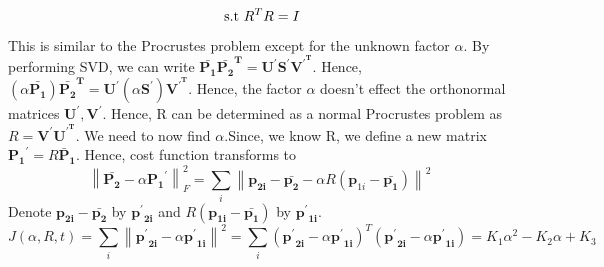 \documentclass[11pt]{article}
\newcommand{\norm}[1]{\left\lVert#1\right\rVert}
\begin{document}
\begin{enumerate}
\begin{itemize}
\begin{equation}
		\textnormal{  s.t  } R^TR = I
	\end{equation}\newline
		This is similar to the Procrustes problem except for the unknown factor $\alpha$. By performing SVD, we can write  $\mathbf{\bar{P_1}}\mathbf{\bar{P_2}^T}=\mathbf{U^{'}}\mathbf{S^{'}}\mathbf{V^{'^{T}}}$. Hence, $(\alpha\mathbf{\bar{P_1}})\mathbf{\bar{P_2}^T}=\mathbf{U^{'}}(\alpha\mathbf{S^{'}})\mathbf{V^{'^{T}}}$. Hence, the factor $\alpha$ doesn't effect the orthonormal matrices $\mathbf{U^{'}},\mathbf{V^{'}}$. Hence, R can be determined as a normal Procrustes problem as $R=\mathbf{V^{'}}\mathbf{U^{'^{T}}}$.\newline
		We need to now find $\alpha$.Since, we know R, we define a new matrix $\mathbf{{P_1}^{'}} = R\mathbf{\bar{P}_1}$. Hence, cost function transforms to 
		\begin{equation}		
	\norm{\mathbf{\bar{P_2}} - \alpha  \mathbf{{P_1}^{'}}}_F^2=\sum_i{\norm{\mathbf{{p}_{2i}}-\mathbf{\bar{p_2}} - \alpha R (\mathbf{p}_{1i}-\mathbf{\bar{p_1}})}}^2
				\end{equation}
Denote $\mathbf{{p}_{2i}}-\mathbf{\bar{p_2}}$ by $\mathbf{{p^{'}}_{2i}}$ and $R(\mathbf{{p}_{1i}}-\mathbf{\bar{p_1}})$ by $\mathbf{{p^{'}}_{1i}}$. 
\begin{equation}
J(\alpha,R,t)=\sum_i{\norm{\mathbf{{p^{'}}_{2i}} - \alpha\mathbf{{p^{'}}_{1i}}}}^2=\sum_i(\mathbf{{p^{'}}_{2i}} - \alpha\mathbf{{p^{'}}_{1i}})^T(\mathbf{{p^{'}}_{2i}} - \alpha\mathbf{{p^{'}}_{1i}})=K_1 \alpha^2-K_2 \alpha+K_3
\end{equation}


\end{itemize}
\end{enumerate}
\end{document}
